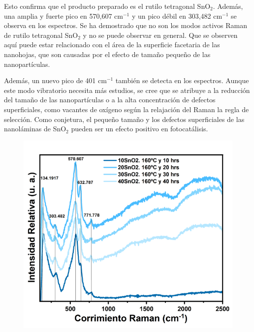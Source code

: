 \documentclass[12pt]{article}
\begin{document}
Esto confirma que el producto preparado es el rutilo tetragonal SnO$\displaystyle _{2}$. Además, una amplia y fuerte pico en 570,607 cm$\displaystyle ^{-1}$ y un pico débil en 303,482 cm$\displaystyle ^{-1}$ se observa en los espectros. Se ha demostrado que no son los modos activos Raman de rutilo tetragonal SnO$\displaystyle _{2}$ y no se puede observar en general. Que se observen aquí puede estar relacionado con el área de la superficie facetaria de las nanohojas, que son causadas por el efecto de tamaño pequeño de las nanopartículas.\vspace{1em} %


Además, un nuevo pico de 401 cm$\displaystyle ^{-1}$ también se detecta en los espectros. Aunque este modo vibratorio necesita más estudios, se cree que se atribuye a la reducción del tamaño de las nanopartículas o a la alta concentración de defectos superficiales, como vacantes de oxígeno según la relajación del Raman la regla de selección. Como conjetura, el pequeño tamaño y los defectos superficiales de las nanoláminas de SnO$\displaystyle _{2}$ pueden ser un efecto positivo en fotocatálisis.

        \begin{figure}[H]
    	   \begin{center}
     	  	\includegraphics[width = 1\textwidth]{Imagenes/RAMAN_SnO2_2.png}
    	   \end{center} 
        \end{figure}
        
\end{document}

